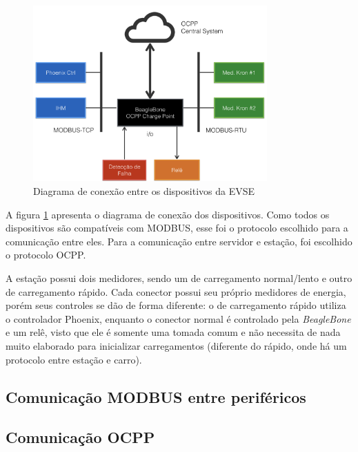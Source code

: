 \begin{figure}[H]
        \begin{center}
                \includegraphics[width=0.8\textwidth,natwidth=400,natheight=288]{assets/images/devices-diagram.png}
                \caption{Diagrama de conexão entre os dispositivos da EVSE}
                \label{fig:proj-diagram}
        \end{center}
\end{figure}

A figura \ref{fig:proj-diagram} apresenta o diagrama de conexão dos dispositivos. Como todos os dispositivos são compatíveis com MODBUS, esse foi o protocolo escolhido para a comunicação entre eles. Para a comunicação entre servidor e estação, foi escolhido o protocolo \ac{OCPP}.

A estação possui dois medidores, sendo um de carregamento normal/lento e outro de carregamento rápido. Cada conector possui seu próprio medidores de energia, porém seus controles se dão de forma diferente: o de carregamento rápido utiliza o controlador Phoenix, enquanto o conector normal é controlado pela \textit{BeagleBone} e um relê, visto que ele é somente uma tomada comum e não necessita de nada muito elaborado para inicializar carregamentos (diferente do rápido, onde há um protocolo entre estação e carro).

\subsection{Comunicação MODBUS entre periféricos}



\subsection{Comunicação OCPP}
